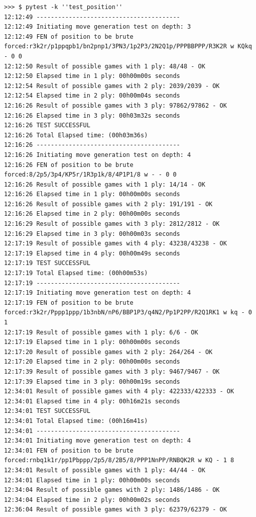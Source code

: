 \documentclass[10pt]{article}
\begin{document}
\begin{lstlisting}
>>> $ pytest -k ''test_position''
12:12:49 ----------------------------------------
12:12:49 Initiating move generation test on depth: 3
12:12:49 FEN of position to be brute forced:r3k2r/p1ppqpb1/bn2pnp1/3PN3/1p2P3/2N2Q1p/PPPBBPPP/R3K2R w KQkq - 0 0
12:12:50 Result of possible games with 1 ply: 48/48 - OK
12:12:50 Elapsed time in 1 ply: 00h00m00s seconds
12:12:54 Result of possible games with 2 ply: 2039/2039 - OK
12:12:54 Elapsed time in 2 ply: 00h00m04s seconds
12:16:26 Result of possible games with 3 ply: 97862/97862 - OK
12:16:26 Elapsed time in 3 ply: 00h03m32s seconds
12:16:26 TEST SUCCESSFUL
12:16:26 Total Elapsed time: (00h03m36s)
12:16:26 ----------------------------------------
12:16:26 Initiating move generation test on depth: 4
12:16:26 FEN of position to be brute forced:8/2p5/3p4/KP5r/1R3p1k/8/4P1P1/8 w - - 0 0
12:16:26 Result of possible games with 1 ply: 14/14 - OK
12:16:26 Elapsed time in 1 ply: 00h00m00s seconds
12:16:26 Result of possible games with 2 ply: 191/191 - OK
12:16:26 Elapsed time in 2 ply: 00h00m00s seconds
12:16:29 Result of possible games with 3 ply: 2812/2812 - OK
12:16:29 Elapsed time in 3 ply: 00h00m03s seconds
12:17:19 Result of possible games with 4 ply: 43238/43238 - OK
12:17:19 Elapsed time in 4 ply: 00h00m49s seconds
12:17:19 TEST SUCCESSFUL
12:17:19 Total Elapsed time: (00h00m53s)
12:17:19 ----------------------------------------
12:17:19 Initiating move generation test on depth: 4
12:17:19 FEN of position to be brute forced:r3k2r/Pppp1ppp/1b3nbN/nP6/BBP1P3/q4N2/Pp1P2PP/R2Q1RK1 w kq - 0 1
12:17:19 Result of possible games with 1 ply: 6/6 - OK
12:17:19 Elapsed time in 1 ply: 00h00m00s seconds
12:17:20 Result of possible games with 2 ply: 264/264 - OK
12:17:20 Elapsed time in 2 ply: 00h00m00s seconds
12:17:39 Result of possible games with 3 ply: 9467/9467 - OK
12:17:39 Elapsed time in 3 ply: 00h00m19s seconds
12:34:01 Result of possible games with 4 ply: 422333/422333 - OK
12:34:01 Elapsed time in 4 ply: 00h16m21s seconds
12:34:01 TEST SUCCESSFUL
12:34:01 Total Elapsed time: (00h16m41s)
12:34:01 ----------------------------------------
12:34:01 Initiating move generation test on depth: 4
12:34:01 FEN of position to be brute forced:rnbq1k1r/pp1Pbppp/2p5/8/2B5/8/PPP1NnPP/RNBQK2R w KQ - 1 8
12:34:01 Result of possible games with 1 ply: 44/44 - OK
12:34:01 Elapsed time in 1 ply: 00h00m00s seconds
12:34:04 Result of possible games with 2 ply: 1486/1486 - OK
12:34:04 Elapsed time in 2 ply: 00h00m02s seconds
12:36:04 Result of possible games with 3 ply: 62379/62379 - OK

\end{lstlisting}
\end{document}
